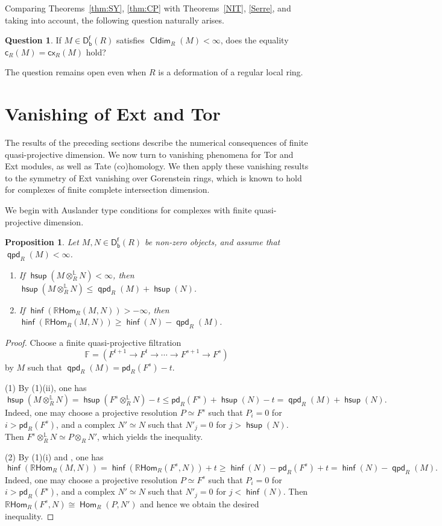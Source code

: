 \documentclass[10pt, a4paper,reqno]{amsart}
\newtheorem{prop}[prop]{Proposition}
\theoremstyle{definition}
\newtheorem{ques}[ques]{Question}
\theoremstyle{remark}
\numberwithin{equation}{thm}
\def\FF{\mathbb{F}}
\def\c{\mathsf{c}}
\def\Hom{\operatorname{\mathsf{Hom}}}
\def\Dfb{\mathsf{D^f_b}}
\def\ltensor{\otimes^{\mathbb{L}}}
\def\rHom{\mathbb{R}\mathsf{Hom}}
\def\hsup{\operatorname{\mathsf{hsup}}}
\def\hinf{\operatorname{\mathsf{hinf}}}
\def\cx{\mathsf{cx}}
\def\CIdim{\operatorname{\mathsf{CIdim}}}
\def\pd{\mathsf{pd}}
\def\qpd{\operatorname{\mathsf{qpd}}}
\begin{document}
Comparing Theorems~\ref{thm:SY}, \ref{thm:CP} with Theorems~\ref{NIT}, \ref{Serre}, and taking  into account, the following question naturally arises.

\begin{ques}
If $M \in \Dfb(R)$ satisfies $\CIdim_R(M) < \infty$, does the equality $\c_R(M) = \cx_R(M)$ hold?	
\end{ques}
\noindent
The question remains open even when $R$ is a deformation of a regular local ring.
\section{Vanishing of Ext and Tor}

The results of the preceding sections describe the numerical consequences of finite quasi-projective dimension.
We now turn to vanishing phenomena for Tor and Ext modules, as well as Tate (co)homology.
We then apply these vanishing results to the symmetry of Ext vanishing over Gorenstein rings, which is known to hold for complexes of finite complete intersection dimension.


We begin with Auslander type conditions for complexes with finite quasi-projective dimension. 


\begin{prop}\label{AC}
Let $M,N\in\Dfb(R)$ be non-zero objects, and assume that $\qpd_R(M)<\infty$.
\begin{enumerate}[\rm(1)]
\item 
If $\hsup(M\ltensor_RN)<\infty$, then $\hsup(M\ltensor_RN) \le \qpd_R(M)+\hsup(N)$.
\item 
If $\hinf(\rHom_R(M,N))>-\infty$, then $\hinf(\rHom_R(M,N)) \ge \hinf (N)-\qpd_R(M)$.
\end{enumerate}
\end{prop}


\begin{proof}
Choose a finite quasi-projective filtration
\[
\FF=(F^{t+1}\to F^t\to\cdots\to F^{s+1}\to F^s)
\]
by $M$ such that $\qpd_R(M) = \pd_R(F^s)-t$.

(1) By (1)(ii), one has
\[
\hsup(M\ltensor_R N) = \hsup(F^s \ltensor_R N) - t \le \pd_R(F^s) + \hsup(N) -t = \qpd_R(M) + \hsup(N).
\]
Indeed, one may choose a projective resolution $P \simeq F^s$ such that $P_i=0$ for $i>\pd_R(F^s)$, and a complex $N'\simeq N$ such that $N'_j=0$ for $j>\hsup(N)$. 
Then $F^s\ltensor_R N \simeq P\otimes_R N'$, which yields the inequality.

(2) By (1)(i) and \cite[Corollary 16.3.6]{CFH}, one has
\[
\hinf(\rHom_R(M,N)) = \hinf(\rHom_R(F^s, N)) + t \ge \hinf(N) - \pd_R(F^s) + t = \hinf(N) - \qpd_R(M).
\]
Indeed, one may choose a projective resolution $P \simeq F^s$ such that $P_i=0$ for $i>\pd_R(F^s)$, and a complex $N' \simeq N$ such that $N'_j=0$ for $j<\hinf(N)$. 
Then $\rHom_R(F^s,N)\cong \Hom_R(P,N')$ and hence we obtain the desired inequality.
\end{proof}
\end{document}
